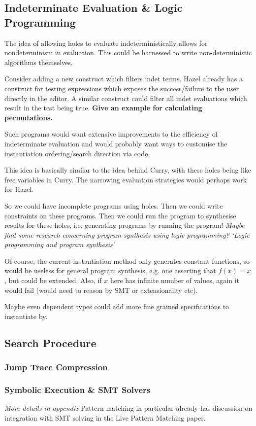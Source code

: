 \subsection{Indeterminate Evaluation \& Logic Programming}
The idea of allowing holes to evaluate indeterministically allows for nondeterminism in evaluation. This could be harnessed to write non-deterministic algorithms themselves.

Consider adding a new construct which filters indet terms. Hazel already has a construct for testing expressions which exposes the success/failure to the user directly in the editor. A similar construct could filter all indet evaluations which result in the test being true. \textbf{Give an example for calculating permutations.}

Such programs would want extensive improvements to the efficiency of indeterminate evaluation and would probably want ways to customise the instantiation ordering/search direction via code.

This idea is basically similar to the idea behind Curry, with these holes being like free variables in Curry. The narrowing evaluation strategies would perhaps work for Hazel.

So we could have incomplete programs using holes. Then we could write constraints on these programs. Then we could run the program to synthesise results for these holes, i.e. generating programs by running the program! \textit{Maybe find some research concerning program synthesis using logic programming? `Logic programming and program synthesis'}

Of course, the current instantiation method only generates constant functions, so would be useless for general program synthesis, e.g. one asserting that $f(x) = x$, but could be extended. Also, if $x$ here has infinite number of values, again it would fail (would need to reason by SMT or extensionality etc).

Maybe even dependent types could add more fine grained specifications to instantiate by.
\subsection{Search Procedure}
\subsubsection{Jump Trace Compression}
\subsubsection{Symbolic Execution \& SMT Solvers}
\textit{More details in appendix}
Pattern matching in particular already has discussion on integration with SMT solving in the Live Pattern Matching paper.

